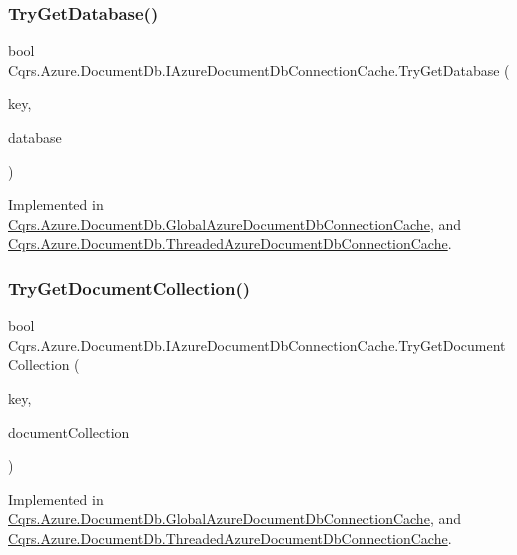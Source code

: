 \subsubsection{\texorpdfstring{Try\+Get\+Database()}{TryGetDatabase()}}
{\footnotesize\ttfamily bool Cqrs.\+Azure.\+Document\+Db.\+I\+Azure\+Document\+Db\+Connection\+Cache.\+Try\+Get\+Database (\begin{DoxyParamCaption}\item[{string}]{key,  }\item[{out Database}]{database }\end{DoxyParamCaption})}



Implemented in \hyperlink{classCqrs_1_1Azure_1_1DocumentDb_1_1GlobalAzureDocumentDbConnectionCache_afa1518eacc7e71308bfe3ef27631da45_afa1518eacc7e71308bfe3ef27631da45}{Cqrs.\+Azure.\+Document\+Db.\+Global\+Azure\+Document\+Db\+Connection\+Cache}, and \hyperlink{classCqrs_1_1Azure_1_1DocumentDb_1_1ThreadedAzureDocumentDbConnectionCache_a00ea55a85c74b84cfc5f2007e3bc9be3_a00ea55a85c74b84cfc5f2007e3bc9be3}{Cqrs.\+Azure.\+Document\+Db.\+Threaded\+Azure\+Document\+Db\+Connection\+Cache}.

\mbox{\label{interfaceCqrs_1_1Azure_1_1DocumentDb_1_1IAzureDocumentDbConnectionCache_af74bf6c8dc009e0179edc20ef3158f03_af74bf6c8dc009e0179edc20ef3158f03}} 
\subsubsection{\texorpdfstring{Try\+Get\+Document\+Collection()}{TryGetDocumentCollection()}}
{\footnotesize\ttfamily bool Cqrs.\+Azure.\+Document\+Db.\+I\+Azure\+Document\+Db\+Connection\+Cache.\+Try\+Get\+Document\+Collection (\begin{DoxyParamCaption}\item[{string}]{key,  }\item[{out Document\+Collection}]{document\+Collection }\end{DoxyParamCaption})}



Implemented in \hyperlink{classCqrs_1_1Azure_1_1DocumentDb_1_1GlobalAzureDocumentDbConnectionCache_a9b178e41d62c9ebcfd8936418d5de009_a9b178e41d62c9ebcfd8936418d5de009}{Cqrs.\+Azure.\+Document\+Db.\+Global\+Azure\+Document\+Db\+Connection\+Cache}, and \hyperlink{classCqrs_1_1Azure_1_1DocumentDb_1_1ThreadedAzureDocumentDbConnectionCache_a0986cecb40fc143751abb4605f507975_a0986cecb40fc143751abb4605f507975}{Cqrs.\+Azure.\+Document\+Db.\+Threaded\+Azure\+Document\+Db\+Connection\+Cache}.

